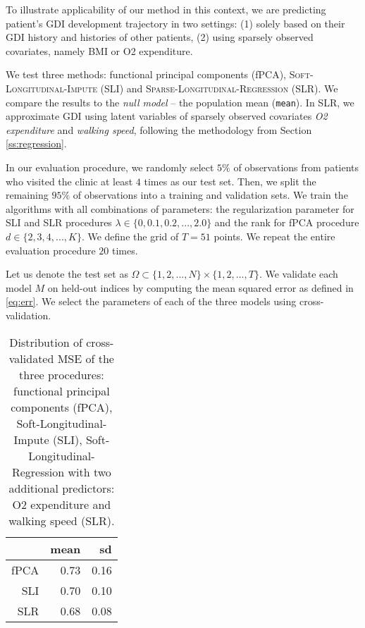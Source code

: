\documentclass[preprint]{imsart}
\numberwithin{equation}{section}
\theoremstyle{plain}
\begin{document}
To illustrate applicability of our method in this context, we are predicting patient's GDI development trajectory in two settings: (1) solely based on their GDI history and histories of other patients, (2) using sparsely observed covariates, namely BMI or O2 expenditure. 

We test three methods: functional principal components (fPCA), \textsc{Soft-Longitudinal-Impute} (SLI) and \textsc{Sparse-Longitudinal-Regression} (SLR). We compare the results to the \emph{null model} -- the population mean (\verb|mean|). In SLR, we approximate GDI using latent variables of sparsely observed covariates \textit{O2 expenditure} and \textit{walking speed}, following the methodology from Section \ref{ss:regression}.

In our evaluation procedure, we randomly select $5\%$ of observations from patients who visited the clinic at least $4$ times as our test set. Then, we split the remaining $95\%$ of observations into a training and validation sets. We train the algorithms with all combinations of parameters: the regularization parameter for SLI and SLR procedures $\lambda \in \{0, 0.1, 0.2, ..., 2.0\}$ and the rank for fPCA procedure $d \in \{2,3,4,...,K\}$. We define the grid of $T = 51$ points. We repeat the entire evaluation procedure $20$ times.

Let us denote the test set as $\Omega \subset \{1,2,...,N\} \times \{1,2,...,T\}$. We validate each model $M$ on held-out indices by computing the mean squared error as defined in \eqref{eq:err}. We select the parameters of each of the three models using cross-validation. %

\begin{table}[ht]
  \centering
\begin{tabular}{rrr}
  \hline
 & mean & sd \\ 
  \hline
  fPCA & 0.73 & 0.16\\
  SLI & 0.70 & 0.10\\
  SLR & 0.68 & 0.08 \\
   \hline
\end{tabular}\label{tbl:data-res}
\caption{Distribution of cross-validated MSE of the three procedures: functional principal components (fPCA), Soft-Longitudinal-Impute (SLI), Soft-Longitudinal-Regression with two additional predictors: O2 expenditure and walking speed (SLR).}
\end{table}
\end{document}
